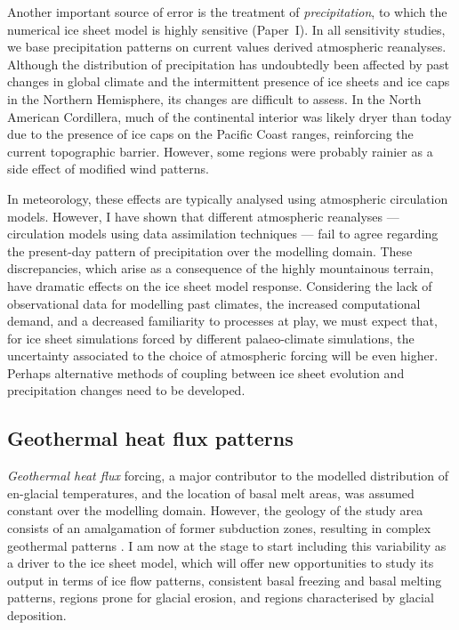 \documentclass{article}
\newcommand{\CCLI}[0]{Paper~I}      %
\begin{document}
Another important source of error is the treatment of \emph{precipitation}, to
which
the numerical ice sheet model is highly sensitive (\CCLI). In all sensitivity
studies, we base precipitation patterns on current values derived atmospheric
reanalyses. Although the distribution of precipitation has undoubtedly
been affected by past changes in global climate and the intermittent presence
of ice sheets and ice caps in the Northern Hemisphere, its changes are
difficult to assess. In the North American Cordillera, much of the continental
interior was likely dryer than today due to the presence of ice caps on the
Pacific Coast ranges, reinforcing the current topographic barrier. However,
some regions were probably rainier as a side effect of modified wind patterns.

In meteorology, these effects are typically analysed using atmospheric
circulation models. However, I have shown that different atmospheric reanalyses
--- circulation models using data assimilation techniques --- fail to agree
regarding the present-day pattern of precipitation over the modelling domain.
These discrepancies, which arise as a consequence of the highly mountainous
terrain, have dramatic effects on the ice sheet model response. Considering the
lack of observational data for modelling past climates, the increased
computational demand, and a decreased familiarity to processes at play, we must
expect that, for ice sheet simulations forced by different palaeo-climate
simulations, the uncertainty associated to the choice of atmospheric forcing
will be even higher. Perhaps alternative methods of coupling between ice sheet
evolution and precipitation changes need to be developed.


\subsection{Geothermal heat flux patterns}

\emph{Geothermal heat flux} forcing, a major contributor to the modelled
distribution
of en-glacial temperatures, and the location of basal melt areas, was assumed
constant over the modelling domain. However, the geology of the study area
consists of an amalgamation of former subduction zones, resulting in complex
geothermal patterns \citep{Blackwell.Richards.2004}. I am now at the stage to
start including this variability as a driver to the ice sheet model, which will
offer new opportunities to study its output in terms of ice flow patterns,
consistent basal freezing and basal melting patterns, regions prone for glacial
erosion, and regions characterised by glacial deposition.
\end{document}
